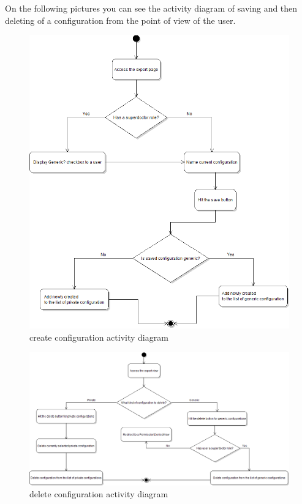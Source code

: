 \documentclass[thesis=B,english]{FITthesis}[2012/10/20]
\begin{document}
On the following pictures you can see the activity diagram of saving and then deleting of a configuration from the point of view of the user.
\begin{figure}\centering
\includegraphics[width=0.7\paperwidth]{createConfigurationDiagram}
		\caption{create configuration activity diagram}\label{fig:logo}
\end{figure}

\begin{figure}\centering
\includegraphics[width=0.7\paperwidth]{deleteConfigurationDiagram}
		\caption{delete configuration activity diagram}\label{fig:logo}
\end{figure}
\end{document}
